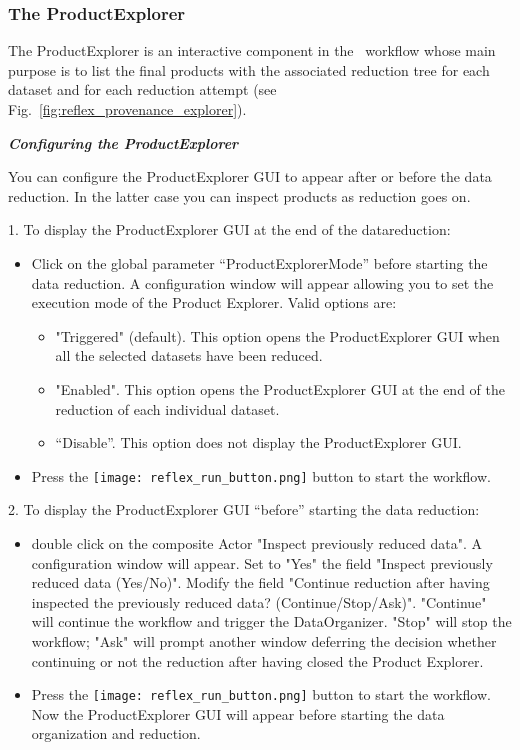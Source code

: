 \subsubsection{The ProductExplorer}
\label{sec:product_explorer}

The ProductExplorer is an interactive component in the \
workflow whose main purpose is to list the final products with the
associated reduction tree for each dataset and for each reduction
attempt (see Fig.~\ref{fig:reflex_provenance_explorer}).

\medskip

{\bf {\it Configuring the ProductExplorer}}

You can configure the ProductExplorer GUI to appear after or before
the data reduction. In the latter case you can inspect products as
reduction goes on.


1. To display the ProductExplorer GUI at the end of the datareduction:

\begin{itemize}

\item Click on the global parameter ``ProductExplorerMode'' before
  starting the data reduction. A configuration window will appear
  allowing you to set the execution mode of the Product
  Explorer. Valid options are:
  \begin{itemize}
  \item "Triggered" (default). This option opens the ProductExplorer
    GUI when all the selected datasets have been reduced.
  \item "Enabled". This option opens the ProductExplorer GUI at the
    end of the reduction of each individual dataset.
  \item ``Disable''. This option does not display the ProductExplorer GUI.
\end{itemize}
 \item Press the \texttt{[image: reflex\_run\_button.png]} button to start the workflow.
\end{itemize}

2. To display the ProductExplorer GUI ``before'' starting the data
reduction:

\begin{itemize}
 
\item double click on the composite Actor "Inspect previously reduced
  data". A configuration window will appear. Set to "Yes" the field
  "Inspect previously reduced data (Yes/No)". Modify the field
  "Continue reduction after having inspected the previously reduced
  data? (Continue/Stop/Ask)". "Continue" will continue the workflow
  and trigger the DataOrganizer. "Stop" will stop the workflow;
  "Ask" will prompt another window deferring the decision whether
  continuing or not the reduction after having closed the Product
  Explorer.

\item Press the \texttt{[image: reflex\_run\_button.png]} button to start the workflow. Now the ProductExplorer
  GUI will appear before starting the data organization and reduction.

\end{itemize}

